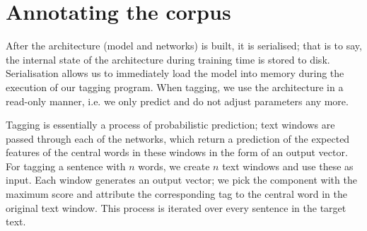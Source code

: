 \section{Annotating the corpus}
\label{sec:annotating}

After the architecture (model and networks) is built, it is
serialised; that is to say, the internal state of the architecture
during training time is stored to disk. Serialisation allows us to
immediately load the model into memory during the execution of our
tagging program. When tagging, we use the architecture in a read-only
manner, i.e. we only predict and do not adjust parameters any more.

Tagging is essentially a process of probabilistic prediction; text
windows are passed through each of the networks, which return a
prediction of the expected features of the central words in these
windows in the form of an output vector. For tagging a sentence with
$n$ words, we create $n$ text windows and use these as input. Each
window generates an output vector; we pick the component with the
maximum score and attribute the corresponding tag to the central word
in the original text window. This process is iterated over every
sentence in the target text. 

